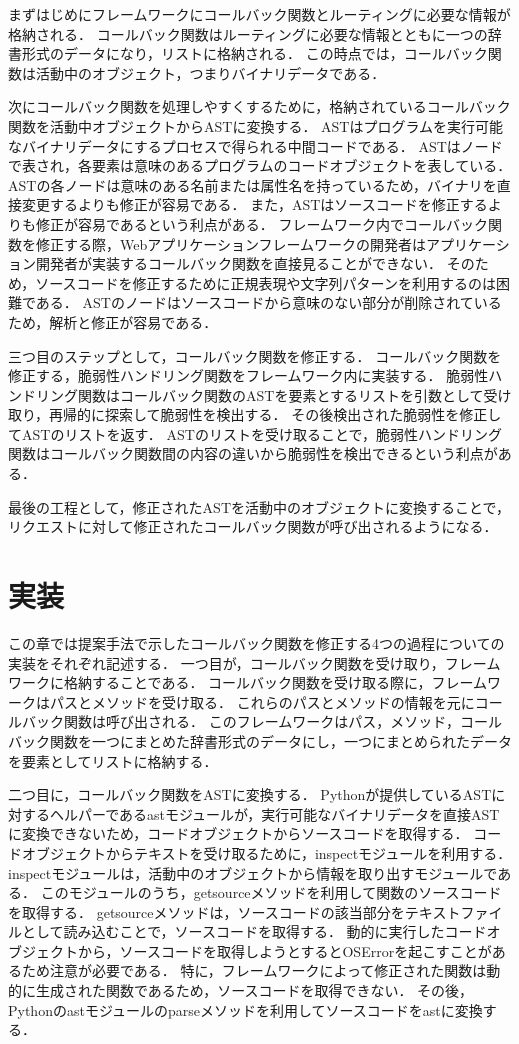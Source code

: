 \documentclass[twocolumn, 10pt, a4paper]{jsarticle}
\begin{document}
まずはじめにフレームワークにコールバック関数とルーティングに必要な情報が格納される．
コールバック関数はルーティングに必要な情報とともに一つの辞書形式のデータになり，リストに格納される．
この時点では，コールバック関数は活動中のオブジェクト，つまりバイナリデータである．

次にコールバック関数を処理しやすくするために，格納されているコールバック関数を活動中オブジェクトからASTに変換する．
ASTはプログラムを実行可能なバイナリデータにするプロセスで得られる中間コードである．
ASTはノードで表され，各要素は意味のあるプログラムのコードオブジェクトを表している．
ASTの各ノードは意味のある名前または属性名を持っているため，バイナリを直接変更するよりも修正が容易である．
また，ASTはソースコードを修正するよりも修正が容易であるという利点がある．
フレームワーク内でコールバック関数を修正する際，Webアプリケーションフレームワークの開発者はアプリケーション開発者が実装するコールバック関数を直接見ることができない．
そのため，ソースコードを修正するために正規表現や文字列パターンを利用するのは困難である．
ASTのノードはソースコードから意味のない部分が削除されているため，解析と修正が容易である．

三つ目のステップとして，コールバック関数を修正する．
コールバック関数を修正する，脆弱性ハンドリング関数をフレームワーク内に実装する．
脆弱性ハンドリング関数はコールバック関数のASTを要素とするリストを引数として受け取り，再帰的に探索して脆弱性を検出する．
その後検出された脆弱性を修正してASTのリストを返す．
ASTのリストを受け取ることで，脆弱性ハンドリング関数はコールバック関数間の内容の違いから脆弱性を検出できるという利点がある．

最後の工程として，修正されたASTを活動中のオブジェクトに変換することで，リクエストに対して修正されたコールバック関数が呼び出されるようになる．

\section{実装}
この章では提案手法で示したコールバック関数を修正する4つの過程についての実装をそれぞれ記述する．
一つ目が，コールバック関数を受け取り，フレームワークに格納することである．
コールバック関数を受け取る際に，フレームワークはパスとメソッドを受け取る．
これらのパスとメソッドの情報を元にコールバック関数は呼び出される．
このフレームワークはパス，メソッド，コールバック関数を一つにまとめた辞書形式のデータにし，一つにまとめられたデータを要素としてリストに格納する．

二つ目に，コールバック関数をASTに変換する．
Pythonが提供しているASTに対するヘルパーであるastモジュールが，実行可能なバイナリデータを直接ASTに変換できないため，コードオブジェクトからソースコードを取得する．
コードオブジェクトからテキストを受け取るために，inspectモジュールを利用する．
inspectモジュールは，活動中のオブジェクトから情報を取り出すモジュールである．
このモジュールのうち，getsourceメソッドを利用して関数のソースコードを取得する．
getsourceメソッドは，ソースコードの該当部分をテキストファイルとして読み込むことで，ソースコードを取得する．
動的に実行したコードオブジェクトから，ソースコードを取得しようとするとOSErrorを起こすことがあるため注意が必要である．
特に，フレームワークによって修正された関数は動的に生成された関数であるため，ソースコードを取得できない．
その後，Pythonのastモジュールのparseメソッドを利用してソースコードをastに変換する．
\end{document}
